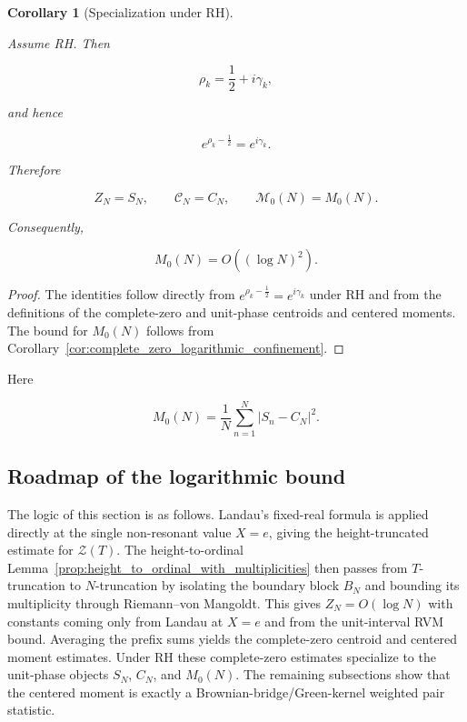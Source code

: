 \documentclass[11pt]{amsart}
\numberwithin{equation}{section}
\theoremstyle{plain}
\newtheorem{corollary}[theorem]{Corollary}
\theoremstyle{definition}
\theoremstyle{remark}
\begin{document}
\begin{corollary}[Specialization under RH]
\label{cor:RH_specialization_complete_zero_walk}
\label{cor:M0_log_square_bound_RH}

Assume RH. Then

\begin{equation}
\rho_k
=
\frac12+i\gamma_k,
\label{eq:rho_k_RH_specialization}
\end{equation}

and hence

\begin{equation}
e^{\rho_k-\frac12}
=
e^{i\gamma_k}.
\label{eq:complete_zero_phase_RH_specialization}
\end{equation}

Therefore

\begin{equation}
Z_N=S_N,
\qquad
\mathcal C_N=C_N,
\qquad
\mathcal M_0(N)=M_0(N).
\label{eq:complete_zero_RH_identification}
\end{equation}

Consequently,

\begin{equation}
M_0(N)
=
O\!\left((\log N)^2\right).
\label{eq:M0_log_square_bound_RH}
\end{equation}

\end{corollary}

\begin{proof}
The identities follow directly from
\(e^{\rho_k-\frac12}=e^{i\gamma_k}\) under RH and from the definitions of
the complete-zero and unit-phase centroids and centered moments. The
bound for \(M_0(N)\) follows from
Corollary~\ref{cor:complete_zero_logarithmic_confinement}.
\end{proof}

Here

\begin{equation}
M_0(N)
=
\frac1N
\sum_{n=1}^{N}|S_n-C_N|^2.
\label{eq:M0_definition}
\end{equation}

\subsection{Roadmap of the logarithmic bound}
\label{subsec:logarithmic_bound_roadmap}

The logic of this section is as follows. Landau's fixed-real formula is
applied directly at the single non-resonant value \(X=e\), giving the
height-truncated estimate for \(\mathcal Z(T)\). The
height-to-ordinal Lemma~\ref{prop:height_to_ordinal_with_multiplicities}
then passes from \(T\)-truncation to \(N\)-truncation by isolating the
boundary block \(B_N\) and bounding its multiplicity through
Riemann--von Mangoldt. This gives \(Z_N=O(\log N)\) with constants
coming only from Landau at \(X=e\) and from the unit-interval RVM bound.
Averaging the prefix sums yields the complete-zero centroid and centered
moment estimates. Under RH these complete-zero estimates specialize to
the unit-phase objects \(S_N\), \(C_N\), and \(M_0(N)\). The remaining
subsections show that the centered moment is exactly a
Brownian-bridge/Green-kernel weighted pair statistic.
\end{document}
